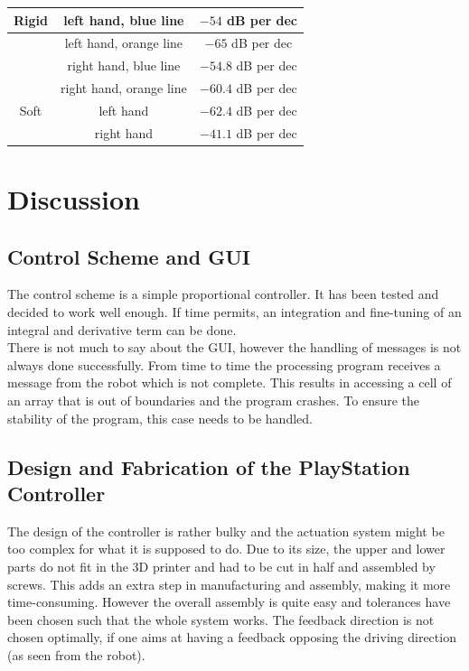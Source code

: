 	\begin{tabular}{|c|c|c|}
		\hline 
		Rigid & left hand, blue line & $-54$ dB per dec \\ 
		\hline 
		& left hand, orange line & $-65$ dB per dec \\ 
		\hline 
		& right hand, blue line & $-54.8$ dB per dec \\ 
		\hline 
		& right hand, orange line & $-60.4$ dB per dec \\ 
		\hline 
		Soft & left hand & $-62.4$ dB per dec  \\ 
		\hline 
		& right hand & $-41.1$ dB per dec \\ 
		\hline 
	\end{tabular} 
	
	\section{Discussion}
	\subsection{Control Scheme and GUI}
	The control scheme is a simple proportional controller. It has been tested and decided to work well enough. If time permits, an integration and fine-tuning of an integral and derivative term can be done. \\
	There is not much to say about the GUI, however the handling of messages is not always done successfully. From time to time the processing program receives a message from the robot which is not complete. This results in accessing a cell of an array that is out of boundaries and the program crashes. To ensure the stability of the program, this case needs to be handled.
	
	\subsection{Design and Fabrication of the PlayStation Controller}
	The design of the controller is rather bulky and the actuation system might be too complex for what it is supposed to do. Due to its size, the upper and lower parts do not fit in the 3D printer and had to be cut in half and assembled by screws. This adds an extra step in manufacturing and assembly, making it more time-consuming. However the overall assembly is quite easy and tolerances have been chosen such that the whole system works. The feedback direction is not chosen optimally, if one aims at having a feedback opposing the driving direction (as seen from the robot).
	

